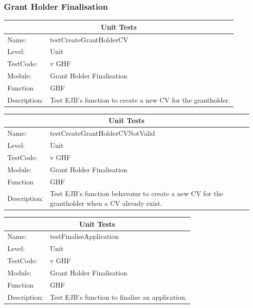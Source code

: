 \documentclass[12pt]{article}
\begin{document}
\subsubsection{Grant Holder Finalisation}

\begin{center}
\begin{tabular}{|l|p{12cm}|}
\hline
\multicolumn{2}{|c|}{\bf Unit Tests} \\
\hline
 Name: & testCreateGrantHolderCV  \\
\hline
Level: & Unit \\
\hline
TestCode: & v GHF \\
\hline
Module:& Grant Holder Finalisation \\
\hline
Function & GHF \\
\hline
Description: & Test EJB's function to create a new CV for the grantholder. \\
\hline
\end{tabular}
\end{center}

\begin{center}
\begin{tabular}{|l|p{12cm}|}
\hline
\multicolumn{2}{|c|}{\bf Unit Tests} \\
\hline
 Name: & testCreateGrantHolderCVNotValid  \\
\hline
Level: & Unit \\
\hline
TestCode: & v GHF \\
\hline
Module:& Grant Holder Finalisation \\
\hline
Function & GHF \\
\hline
Description: & Test EJB's function behavoiur to create a new CV for the grantholder when a CV already exist. \\
\hline
\end{tabular}
\end{center}

\begin{center}
\begin{tabular}{|l|p{12cm}|}
\hline
\multicolumn{2}{|c|}{\bf Unit Tests} \\
\hline
 Name: & testFinaliseApplication  \\
\hline
Level: & Unit \\
\hline
TestCode: & v GHF \\
\hline
Module:& Grant Holder Finalisation \\
\hline
Function & GHF \\
\hline
Description: & Test EJB's function to finalise an application. \\
\hline
\end{tabular}
\end{center}
\end{document}
